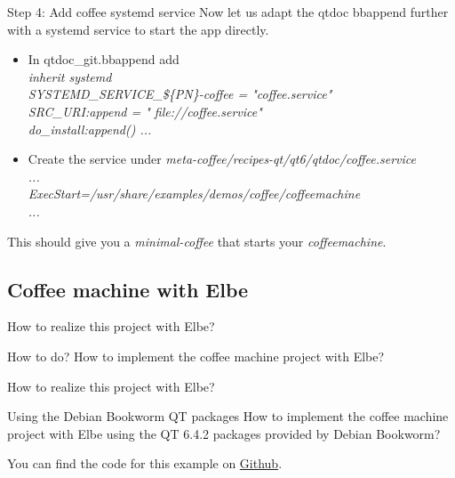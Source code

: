 \documentclass{beamer}
\begin{document}
\begin{frame}{Step 4: Add coffee systemd service}
	Now let us adapt the qtdoc bbappend further with a systemd service to start the app
	directly.
	\begin{itemize}
		\item In qtdoc\_git.bbappend add\\
			\emph{inherit systemd \\
				 SYSTEMD\_SERVICE\_\$\{PN\}-coffee = "coffee.service" \\
				 SRC\_URI:append = " file://coffee.service" \\
				 do\_install:append() ...}
		\item Create the service under \emph{meta-coffee/recipes-qt/qt6/qtdoc/coffee.service}\\
				\emph{...\\
					  ExecStart=/usr/share/examples/demos/coffee/coffeemachine\\
					  ...}
	\end{itemize}
	This should give you a  \emph{minimal-coffee} that starts your \emph{coffeemachine}.
\end{frame}

\subsection{Coffee machine with Elbe}

\begin{frame}{How to realize this project with Elbe?}
	\begin{block}{How to do?}
		How to implement the coffee machine project with Elbe?
	\end{block}
\end{frame}

\begin{frame}{How to realize this project with Elbe?}
	\begin{block}{Using the Debian Bookworm QT packages}
		How to implement the coffee machine project with Elbe using the QT 6.4.2 packages provided by Debian Bookworm?
	\end{block}

	You can find the code for this example on
	\href{https://github.com/tomirgang/eh21_maintainable_linux/tree/main/examples/elbe_advanced}{Github}.
\end{frame}
\end{document}
